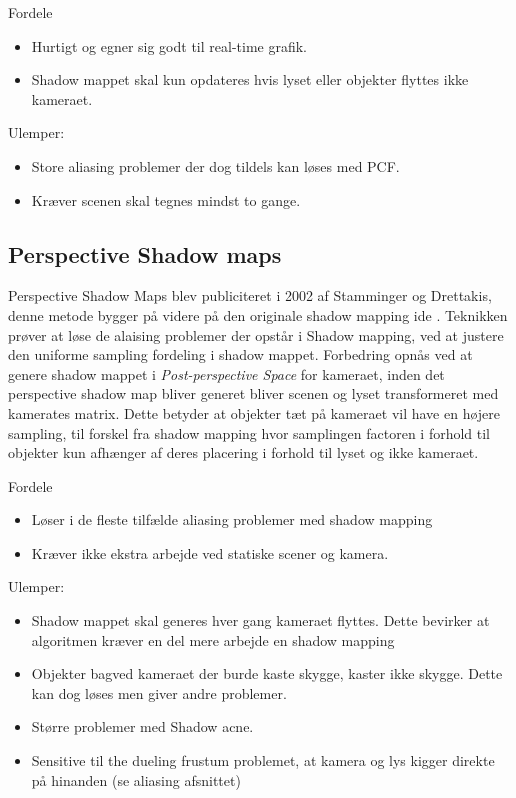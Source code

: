 \documentclass[11pt,a4paper]{article}
\begin{document}
Fordele
\begin{itemize}
  \item Hurtigt og egner sig godt til real-time grafik.
  \item Shadow mappet skal kun opdateres hvis lyset eller objekter flyttes ikke kameraet.
\end{itemize}

Ulemper:
\begin{itemize}
  \item Store aliasing problemer der dog tildels kan løses med PCF.
  \item Kræver scenen skal tegnes mindst to gange.
\end{itemize}


\subsection{Perspective Shadow maps}

Perspective Shadow Maps \cite{PSMAP} blev publiciteret i 2002 af Stamminger og Drettakis, denne metode bygger på videre på den originale shadow mapping ide \cite{SMAP}. Teknikken prøver at løse de alaising problemer der opstår i Shadow mapping, ved at justere den uniforme sampling fordeling i shadow mappet. Forbedring opnås ved at genere shadow mappet i \textit{Post-perspective Space} for kameraet, inden det perspective shadow map bliver generet bliver scenen og lyset transformeret med kamerates matrix. Dette betyder at objekter tæt på kameraet vil have en højere sampling, til forskel fra shadow mapping hvor samplingen factoren i forhold til objekter kun afhænger af deres placering i forhold til lyset og ikke kameraet.


Fordele
\begin{itemize}
  \item Løser i de fleste tilfælde aliasing problemer med shadow mapping
  \item Kræver ikke ekstra arbejde ved statiske scener og kamera.
\end{itemize}

Ulemper:
\begin{itemize}
  \item Shadow mappet skal generes  hver gang kameraet flyttes. Dette bevirker at algoritmen kræver en del mere arbejde en shadow mapping
  \item Objekter bagved kameraet der burde kaste skygge, kaster ikke skygge. Dette kan dog løses men giver andre problemer.
  \item Større problemer med Shadow acne.
  \item	Sensitive til the dueling frustum problemet, at kamera og lys kigger direkte på hinanden (se aliasing afsnittet)
\end{itemize}
\end{document}

